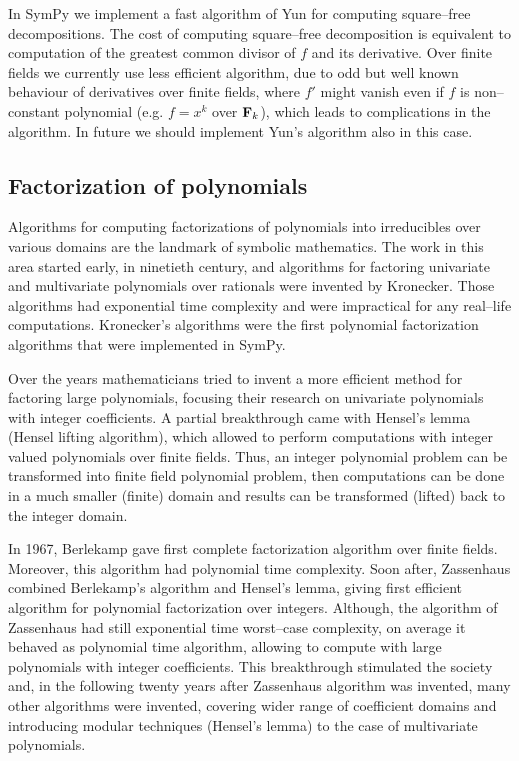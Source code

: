 In SymPy we implement a fast algorithm of Yun \cite{Yun1976squarefree} for computing square--free
decompositions. The cost of computing square--free decomposition is equivalent to computation
of the greatest common divisor of $f$ and its derivative. Over finite fields we currently use
less efficient algorithm, due to odd but well known behaviour of derivatives over finite fields,
where $f'$ might vanish even if $f$ is non--constant polynomial (e.g. $f = x^k$ over $\mathbf{F}_k$),
which leads to complications in the algorithm. In future we should implement Yun's algorithm
also in this case.


\subsection{Factorization of polynomials}

Algorithms for computing factorizations of polynomials into irreducibles over various domains
are the landmark of symbolic mathematics. The work in this area started early, in ninetieth
century, and algorithms for factoring univariate and multivariate polynomials over rationals
were invented by Kronecker. Those algorithms had exponential time complexity and were impractical
for any real--life computations. Kronecker's algorithms were the first polynomial factorization
algorithms that were implemented in SymPy.

Over the years mathematicians tried to invent a more efficient method for factoring large polynomials,
focusing their research on univariate polynomials with integer coefficients. A partial breakthrough
came with Hensel's lemma (Hensel lifting algorithm), which allowed to perform computations with integer
valued polynomials over finite fields. Thus, an integer polynomial problem can be transformed into
finite field polynomial problem, then computations can be done in a much smaller (finite) domain and
results can be transformed (lifted) back to the integer domain.

In 1967, Berlekamp gave first complete factorization algorithm over finite fields. Moreover, this
algorithm had polynomial time complexity. Soon after, Zassenhaus combined Berlekamp's algorithm and
Hensel's lemma, giving first efficient algorithm for polynomial factorization over integers. Although,
the algorithm of Zassenhaus had still exponential time worst--case complexity, on average it behaved
as polynomial time algorithm, allowing to compute with large polynomials with integer coefficients.
This breakthrough stimulated the society and, in the following twenty years after Zassenhaus algorithm
was invented, many other algorithms were invented, covering wider range of coefficient domains and
introducing modular techniques (Hensel's lemma) to the case of multivariate polynomials.


